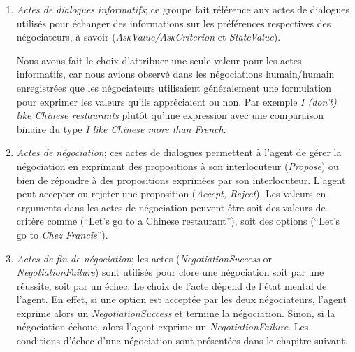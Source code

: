 \begin{enumerate}
	
	\item \textit{Actes de dialogues informatifs}; ce groupe fait référence aux actes de dialogues utilisés pour échanger des informations sur les préférences respectives des négociateurs, à savoir (\textit{AskValue/AskCriterion} et \textit{StateValue}). 
	
	Nous avons fait le choix d'attribuer une seule valeur pour les actes informatifs, car nous avions observé dans les négociations humain/humain enregistrées que les négociateurs utilisaient généralement une formulation pour exprimer les valeurs qu'ils appréciaient ou non. Par exemple \textit{I (don't) like Chinese restaurants} plutôt qu'une expression avec une comparaison binaire du type \textit{I like Chinese more than French}.
	
	\item \textit{Actes de négociation}; ces actes de dialogues permettent à l'agent de gérer la négociation en exprimant des propositions à son interlocuteur (\textit{Propose}) ou bien de répondre à des propositions exprimées par son interlocuteur. L'agent peut accepter ou rejeter une proposition (\textit{Accept, Reject}). Les valeurs en arguments dans les actes de négociation peuvent être soit des valeurs de critère comme (``Let's go to a Chinese restaurant''), soit des options  (``Let's go to \emph{Chez Francis}''). 
	
	\item \textit{Actes de fin de négociation}; les actes  (\textit{NegotiationSuccess} or \textit{NegotiationFailure}) sont utilisés pour clore une négociation soit par une réussite, soit par un échec. Le choix de l'acte dépend de l'état mental de l'agent. En effet, si une option est acceptée par les deux négociateurs, l'agent exprime alors un \textit{NegotiationSuccess} et termine la négociation. Sinon, si la négociation échoue, alors l'agent exprime un \textit{NegotiationFailure}. Les conditions d'échec d'une négociation sont présentées dans le chapitre suivant.

	
\end{enumerate}

